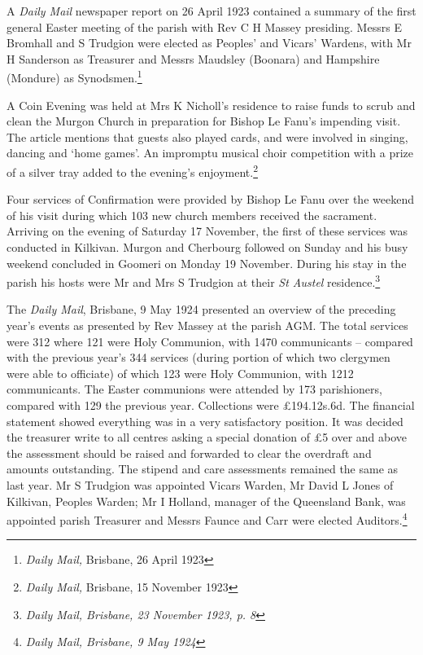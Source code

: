 A \emph{Daily Mail} newspaper report on 26 April 1923 contained a summary of the first general Easter meeting of the parish with Rev C H Massey presiding. Messrs E Bromhall and S Trudgion were elected as Peoples' and Vicars' Wardens, with Mr H Sanderson as Treasurer and Messrs Maudsley (Boonara) and Hampshire (Mondure) as Synodsmen.\footnote{\emph{Daily Mail,} Brisbane, 26 April 1923}


A Coin Evening was held at Mrs K Nicholl's residence to raise funds to scrub and clean the Murgon Church in preparation for Bishop Le Fanu's impending visit. The article mentions that guests also played cards, and were involved in singing, dancing and `home games'. An impromptu musical choir competition with a prize of a silver tray added to the evening's enjoyment.\footnote{\emph{Daily Mail,} Brisbane, 15 November 1923}


Four services of Confirmation were provided by Bishop Le Fanu over the weekend of his visit during which 103 new church members received the sacrament. Arriving on the evening of Saturday 17 November, the first of these services was conducted in Kilkivan. Murgon and Cherbourg followed on Sunday and his busy weekend concluded in Goomeri on Monday 19 November. During his stay in the parish his hosts were Mr and Mrs S Trudgion at their \emph{St Austel} residence.\footnote{\emph{Daily Mail, Brisbane, 23 November 1923, p. 8}}


The \emph{Daily Mail}, Brisbane, 9 May 1924 presented an overview of the preceding year's events as presented by Rev Massey at the parish AGM. The total services were 312 where 121 were Holy Communion, with 1470 communicants -- compared with the previous year's 344 services (during portion of which two clergymen were able to officiate) of which 123 were Holy Communion, with 1212 communicants. The Easter communions were attended by 173 parishioners, compared with 129 the previous year. Collections were \pounds194.12s.6d. The financial statement showed everything was in a very satisfactory position. It was decided the treasurer write to all centres asking a special donation of \pounds5 over and above the assessment should be raised and forwarded to clear the overdraft and amounts outstanding. The stipend and care assessments remained the same as last year. Mr S Trudgion was appointed Vicars Warden, Mr David L Jones of Kilkivan, Peoples Warden; Mr I Holland, manager of the Queensland Bank, was appointed parish Treasurer and Messrs Faunce and Carr were elected Auditors.\footnote{\emph{Daily Mail, Brisbane, 9 May 1924}}


